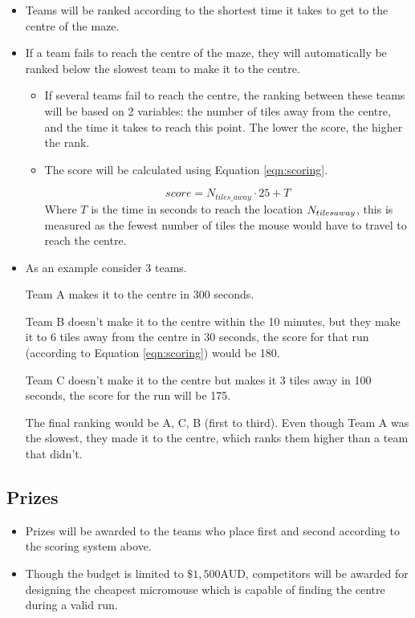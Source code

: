 \documentclass[a4paper,12pt]{article}
\begin{document}
\begin{itemize}
    \item Teams will be ranked according to the shortest time it takes to get to the centre of the maze.
    \item If a team fails to reach the centre of the maze, they will automatically be ranked below the slowest team to make it to the centre. 
    \begin{itemize}
        \item If several teams fail to reach the centre, the ranking between these teams will be based on 2 variables: the number of tiles away from the centre, and the time it takes to reach this point. The lower the score, the higher the rank.
        \item The score will be calculated using Equation \ref{eqn:scoring}.

        \begin{equation}\label{eqn:scoring}
            score=N_{tiles\_away}\cdot 25 + T
        \end{equation}
        Where $T$ is the time in seconds to reach the location $N_{tiles \space away}$, this is measured as the fewest number of tiles the mouse would have to travel to reach the centre. %

    \end{itemize}

    \item As an example consider 3 teams.

    Team A makes it to the centre in 300 seconds.
    
    Team B doesn't make it to the centre within the 10 minutes, but they make it to 6 tiles away from the centre in 30 seconds, the score for that run (according to Equation \ref{eqn:scoring}) would be 180. 
        
    Team C doesn't make it to the centre but makes it 3 tiles away in 100 seconds, the score for the run will be 175.

    The final ranking would be A, C, B (first to third). Even though Team A was the slowest, they made it to the centre, which ranks them higher than a team that didn't.
    
\end{itemize}


\subsection{Prizes}
\begin{itemize}
    \item Prizes will be awarded to the teams who place first and second according to the scoring system above.
    
    \item Though the budget is limited to $\$1,500$AUD, competitors will be awarded for designing the cheapest micromouse which is capable of finding the centre during a valid run.
\end{itemize}
\end{document}
